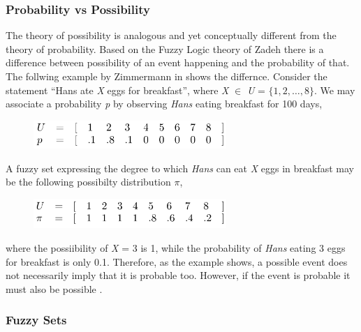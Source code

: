 \documentclass[11pt]{article}
\begin{document}
\subsubsection{Probability vs Possibility}

The theory of possibility is analogous and yet conceptually different from the
theory of probability. Based on the Fuzzy Logic theory of Zadeh
\cite{zadeh:fuzzy} there is a difference between possibility of an event
happening and the probability of that. The follwing example by Zimmermann in
\cite{zimmermann:fuzzy-sets} shows the differnce. Consider the statement ``Hans
ate \textit{X} eggs for breakfast'', where \textit{X} $\in$ \textit{U} = $\{1,
2, \ldots, 8\}$. We may associate a probability \textit{p} by observing
\textit{Hans} eating breakfast for 100 days,

\begin{figure}[tbh]
  \center
  \includegraphics[width=0.65\textwidth]{figure/prob-poss-01.png}
  \label{fig:probability}
\end{figure}

A fuzzy set expressing the degree to which \textit{Hans} can eat \textit{X} eggs
in breakfast may be the following possibilty distribution $\pi$,

\begin{figure}[tbh]
  \center
  \includegraphics[width=0.65\textwidth]{figure/prob-poss-02.png}
  \label{fig:ppssibility}
\end{figure}

where the possiibility of \textit{X} = 3 is 1, while the probability of
\textit{Hans} eating 3 eggs for breakfast is only 0.1. Therefore, as the example
shows, a possible event does not necessarily imply that it is probable too.
However, if the event is probable it must also be possible
\cite{zimmermann:fuzzy-sets}.

\subsubsection{Fuzzy Sets}
\end{document}
